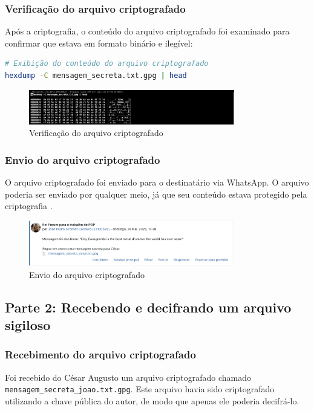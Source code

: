 \subsubsection{Verificação do arquivo criptografado}
Após a criptografia, o conteúdo do arquivo criptografado foi examinado para confirmar que estava em formato binário e ilegível:

\begin{lstlisting}[language=bash]
# Exibição do conteúdo do arquivo criptografado
hexdump -C mensagem_secreta.txt.gpg | head
\end{lstlisting}

\begin{figure}[htb]
    \centering
    \includegraphics[width=0.8\textwidth]{images/10-verificacao_arquivo_criptografado.jpg}
    \caption{Verificação do arquivo criptografado}
    \label{fig:verificacao-arq-cripto}
\end{figure}

\subsubsection{Envio do arquivo criptografado}
O arquivo criptografado foi enviado para o destinatário via WhatsApp. O arquivo poderia ser enviado por qualquer meio, já que seu conteúdo estava protegido pela criptografia \cite{pgpbest}.

\begin{figure}[htb]
    \centering
    \includegraphics[width=0.8\textwidth]{images/10-envio_arquivo.jpg}
    \caption{Envio do arquivo criptografado}
    \label{fig:envio-arquivo}
\end{figure}

\subsection{Parte 2: Recebendo e decifrando um arquivo sigiloso}

\subsubsection{Recebimento do arquivo criptografado}
Foi recebido do César Augusto um arquivo criptografado chamado \texttt{mensagem\_secreta\_joao.txt.gpg}. Este arquivo havia sido criptografado utilizando a chave pública do autor, de modo que apenas ele poderia decifrá-lo.

